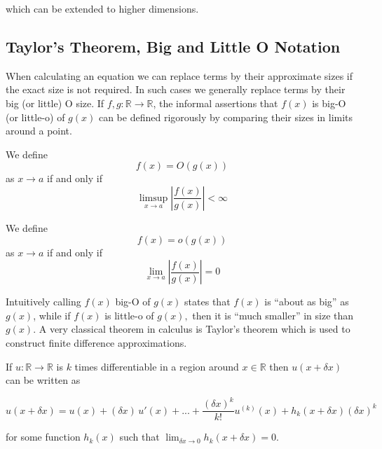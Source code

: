 \documentclass[../main.tex]{subfiles}
\begin{document}
  which can be extended to higher dimensions.

  \subsection{Taylor's Theorem, Big and Little O Notation}
  When calculating an equation we can replace terms by their approximate sizes if the exact size is not required. In such cases we generally replace terms by their big (or little) O size. If $f, g : \mathbb{R} \to \mathbb{R}$, the informal assertions that $f(x)$ is big-O (or little-o) of $g(x)$ can be defined rigorously by comparing their sizes in limits around a point.

  \begin{definition}[Big O]
    We define
    \begin{equation}
      f(x) = O(g(x))
    \end{equation}
    as $x \to a$ if and only if
    \begin{equation}
      \limsup_{x \to a} \left\vert \frac{f(x)}{g(x)} \right\vert < \infty
    \end{equation}
  \end{definition}

  \begin{definition}[Little O]
    We define
    \begin{equation}
      f(x) = o(g(x))
    \end{equation}
    as $x \to a$ if and only if
    \begin{equation}
      \lim_{x \to a} \left\vert \frac{f(x)}{g(x)} \right\vert = 0
    \end{equation}
  \end{definition}

  Intuitively calling $f(x)$ big-O of $g(x)$ states that $f(x)$ is ``about as big'' as $g(x)$, while if $f(x)$ is little-o of $g(x),$ then it is ``much smaller'' in size than $g(x)$. A very classical theorem in calculus is Taylor's theorem which is used to construct finite difference approximations.

  \begin{theorem}[Taylor]
    If $u : \mathbb{R} \to \mathbb{R}$ is $k$ times differentiable in a region around $x \in \mathbb{R}$ then $u(x + \delta x)$ can be written as

    \begin{equation} \label{diff:eq:taylor}
      u(x + \delta x) = u(x) + (\delta x) \, u'(x) + ... + \frac{(\delta x)^k}{k!} u^{(k)}(x) + h_k(x + \delta x) (\delta x)^k
    \end{equation}

    for some function $h_k(x)$ such that $\lim_{\delta x \to 0} h_k(x + \delta x) = 0$.
  \end{theorem}
\end{document}
